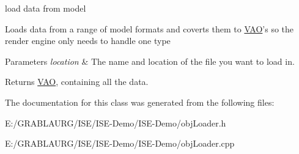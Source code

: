 load data from model 

Loads data from a range of model formats and coverts them to \hyperlink{class_v_a_o}{V\-A\-O}'s so the render engine only needs to handle one type


\begin{DoxyParams}{Parameters}
{\em location} & The name and location of the file you want to load in. \\
\hline
\end{DoxyParams}
\begin{DoxyReturn}{Returns}
\hyperlink{class_v_a_o}{V\-A\-O}, containing all the data. 
\end{DoxyReturn}


The documentation for this class was generated from the following files\-:\begin{DoxyCompactItemize}
\item 
E\-:/\-G\-R\-A\-B\-L\-A\-U\-R\-G/\-I\-S\-E/\-I\-S\-E-\/\-Demo/\-I\-S\-E-\/\-Demo/obj\-Loader.\-h\item 
E\-:/\-G\-R\-A\-B\-L\-A\-U\-R\-G/\-I\-S\-E/\-I\-S\-E-\/\-Demo/\-I\-S\-E-\/\-Demo/obj\-Loader.\-cpp\end{DoxyCompactItemize}
